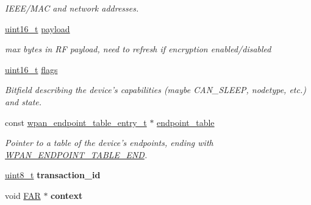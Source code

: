 \begin{DoxyCompactItemize}
\begin{DoxyCompactList}\small\item\em I\-E\-E\-E/\-M\-A\-C and network addresses. \end{DoxyCompactList}\item 
\hypertarget{group__wpan__aps_ga27ab4ae0aba390adfd9907aeebd88b9c}{\hyperlink{group__hal_ga5a8b2dc9e45a9ee81a94ef304fb62505}{uint16\-\_\-t} \hyperlink{group__wpan__aps_ga27ab4ae0aba390adfd9907aeebd88b9c}{payload}}\label{group__wpan__aps_ga27ab4ae0aba390adfd9907aeebd88b9c}

\begin{DoxyCompactList}\small\item\em max bytes in R\-F payload, need to refresh if encryption enabled/disabled \end{DoxyCompactList}\item 
\hyperlink{group__hal_ga5a8b2dc9e45a9ee81a94ef304fb62505}{uint16\-\_\-t} \hyperlink{group__wpan__aps_ga1e87af3c18a2fd36c61faf89949bdc3f}{flags}
\begin{DoxyCompactList}\small\item\em Bitfield describing the device's capabilities (maybe C\-A\-N\-\_\-\-S\-L\-E\-E\-P, nodetype, etc.) and state. \end{DoxyCompactList}\item 
const \hyperlink{structwpan__endpoint__table__entry__t}{wpan\-\_\-endpoint\-\_\-table\-\_\-entry\-\_\-t} $\ast$ \hyperlink{group__wpan__aps_gad7c834ea25a2f008caaf40ec08aa5a86}{endpoint\-\_\-table}
\begin{DoxyCompactList}\small\item\em Pointer to a table of the device's endpoints, ending with \hyperlink{group__wpan__aps_gaac571cafa96f8201c714feb0634afa92}{W\-P\-A\-N\-\_\-\-E\-N\-D\-P\-O\-I\-N\-T\-\_\-\-T\-A\-B\-L\-E\-\_\-\-E\-N\-D}. \end{DoxyCompactList}\item 
\hypertarget{group__wpan__aps_ga3f721807b5c6f0b5c39977390b5bf408}{\hyperlink{group__hal_gae1affc9ca37cfb624959c866a73f83c2}{uint8\-\_\-t} {\bfseries transaction\-\_\-id}}\label{group__wpan__aps_ga3f721807b5c6f0b5c39977390b5bf408}

\item 
\hypertarget{group__wpan__aps_gaa91f8e864e06077c354e5f5216547758}{void \hyperlink{group__hal_gaef060b3456fdcc093a7210a762d5f2ed}{F\-A\-R} $\ast$ {\bfseries context}}\label{group__wpan__aps_gaa91f8e864e06077c354e5f5216547758}


\end{DoxyCompactItemize}
